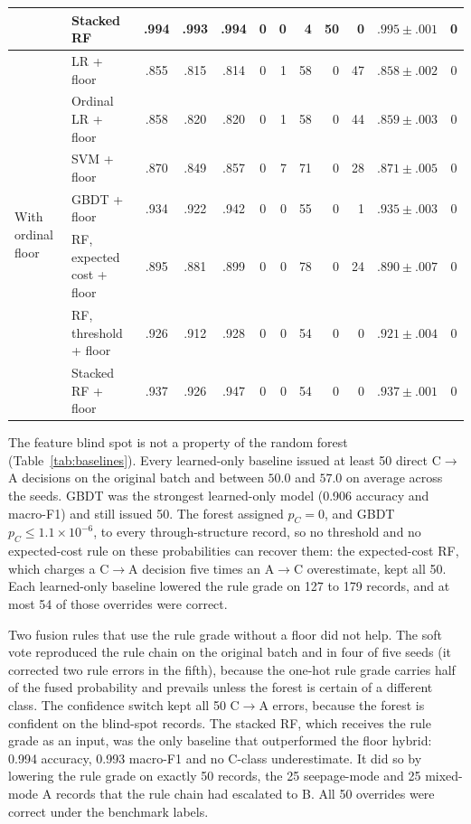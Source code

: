 \documentclass[journal]{IEEEtran}
\newcommand{\CtoA}{C$\rightarrow$A}
\begin{document}
\begin{table}[t]
\begin{tabular}{@{}llccccrrrrcc@{}}
  & Stacked RF & .994 & .993 & .994 & 0 & 0 & 4 & 50 & 0 & $.995\pm.001$ & 0 \\
\midrule
 \multirow{7}{*}{With ordinal floor} & LR + floor & .855 & .815 & .814 & 0 & 1 & 58 & 0 & 47 & $.858\pm.002$ & 0 \\
  & Ordinal LR + floor & .858 & .820 & .820 & 0 & 1 & 58 & 0 & 44 & $.859\pm.003$ & 0 \\
  & SVM + floor & .870 & .849 & .857 & 0 & 7 & 71 & 0 & 28 & $.871\pm.005$ & 0 \\
  & GBDT + floor & .934 & .922 & .942 & 0 & 0 & 55 & 0 & 1 & $.935\pm.003$ & 0 \\
  & RF, expected cost + floor & .895 & .881 & .899 & 0 & 0 & 78 & 0 & 24 & $.890\pm.007$ & 0 \\
  & \cellcolor{floorc!10}RF, threshold + floor & \cellcolor{floorc!10}.926 & \cellcolor{floorc!10}.912 & \cellcolor{floorc!10}.928 & \cellcolor{floorc!10}0 & \cellcolor{floorc!10}0 & \cellcolor{floorc!10}54 & \cellcolor{floorc!10}0 & \cellcolor{floorc!10}0 & \cellcolor{floorc!10}$.921\pm.004$ & \cellcolor{floorc!10}0 \\
  & Stacked RF + floor & .937 & .926 & .947 & 0 & 0 & 54 & 0 & 0 & $.937\pm.001$ & 0 \\
\bottomrule
\end{tabular}
\end{table}

The feature blind spot is not a property of the random forest (Table~\ref{tab:baselines}). Every learned-only baseline issued at least 50 direct \CtoA{} decisions on the original batch and between $50.0$ and $57.0$ on average across the seeds. GBDT was the strongest learned-only model (0.906 accuracy and macro-F1) and still issued 50. The forest assigned $p_C=0$, and GBDT $p_C\leq1.1\times10^{-6}$, to every through-structure record, so no threshold and no expected-cost rule on these probabilities can recover them: the expected-cost RF, which charges a \CtoA{} decision five times an A$\rightarrow$C overestimate, kept all 50. Each learned-only baseline lowered the rule grade on 127 to 179 records, and at most 54 of those overrides were correct.

Two fusion rules that use the rule grade without a floor did not help. The soft vote reproduced the rule chain on the original batch and in four of five seeds (it corrected two rule errors in the fifth), because the one-hot rule grade carries half of the fused probability and prevails unless the forest is certain of a different class. The confidence switch kept all 50 \CtoA{} errors, because the forest is confident on the blind-spot records. The stacked RF, which receives the rule grade as an input, was the only baseline that outperformed the floor hybrid: 0.994 accuracy, 0.993 macro-F1 and no C-class underestimate. It did so by lowering the rule grade on exactly 50 records, the 25 seepage-mode and 25 mixed-mode A records that the rule chain had escalated to B. All 50 overrides were correct under the benchmark labels.
\end{document}
